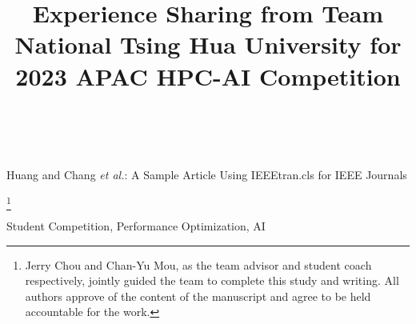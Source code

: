 \documentclass[lettersize,journal]{IEEEtran}
\newcommand\blfootnote[1]{%
  \begingroup
  \renewcommand\thefootnote{}\footnote{#1}%
  \addtocounter{footnote}{-1}%
  \endgroup
}
\begin{document}
\title{Experience Sharing from Team National Tsing Hua University for 2023 APAC HPC-AI Competition}


\author{\\
}

%
{Huang and Chang \MakeLowercase{\textit{et al.}}: A Sample Article Using IEEEtran.cls for IEEE Journals}


\maketitle

\blfootnote{Jerry Chou and Chan-Yu Mou, as the team advisor and student coach respectively, jointly guided the team to complete this study and writing. All authors approve of the content of the manuscript and agree to be held accountable for the work.}





\begin{IEEEkeywords}
Student Competition, Performance Optimization, AI\end{IEEEkeywords}












\end{document}
